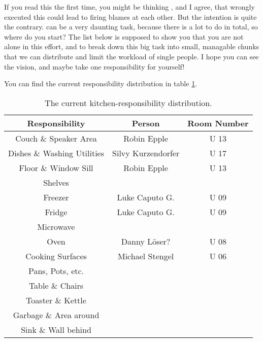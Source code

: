 If you read this the first time, you might be thinking , and I agree, that wrongly executed this could lead to firing blames at each other. But the intention is quite the contrary.  can be a very daunting task, because there is a lot to do in total, so where do you start? The list below is supposed to show you that you are not alone in this effort, and to break down this big task into small, managable chunks that we can distribute and limit the workload of single people. I hope you can see the vision, and maybe take one responsibility for yourself!

You can find the current responsibility distribution in table \ref{tab:kitchen-responsibilities}.

\begin{table}[htp]
    \centering
    \begin{tabular}{ccc}
        \rowcolor[HTML]{F89646} 
        Responsibility              & Person             & Room Number \\ \hline
        Couch \& Speaker Area       & Robin Epple        & U 13        \\ \hline
        Dishes \& Washing Utilities & Silvy Kurzendorfer & U 17        \\ \hline
        Floor \& Window Sill        & Robin Epple        & U 13        \\ \hline
        Shelves                     &                    &             \\ \hline
        Freezer                     & Luke Caputo G.     & U 09        \\ \hline
        Fridge                      & Luke Caputo G.     & U 09        \\ \hline
        Microwave                   &                    &             \\ \hline
        Oven                        & Danny Löser?       & U 08        \\ \hline
        Cooking Surfaces            & Michael Stengel    & U 06        \\ \hline
        Pans, Pots, etc.            &                    &             \\ \hline
        Table \& Chairs             &                    &             \\ \hline
        Toaster \& Kettle           &                    &             \\ \hline
        Garbage \& Area around      &                    &             \\ \hline
        Sink \& Wall behind         &                    &             \\ \hline
    \end{tabular}
    \caption{The current kitchen-responsibility distribution.}
    \label{tab:kitchen-responsibilities}
\end{table}

